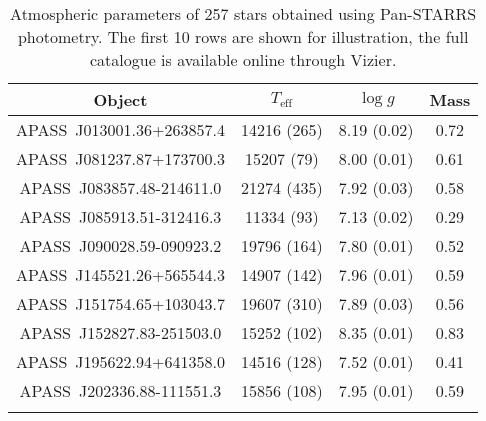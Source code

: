 \documentclass[fleqn,usenatbib, useAMS]{mnras}
\newcommand{\Teff}{\mbox{$T_{\mathrm{eff}}$}}
\newcommand{\logg}{\mbox{$\log g$}}
\begin{document}
\begin{table*}
\centering
\caption{Atmospheric parameters of 257 stars obtained using Pan-STARRS photometry. The first 10 rows are shown for illustration, the full catalogue is available online through Vizier.}
\begin{tabular}{cccc} \hline
Object & \Teff & \logg & Mass \\ \hline
APASS\ J013001.36+263857.4	&	14216	(265)	&	8.19	(0.02)	&	0.72	\\
APASS\ J081237.87+173700.3	&	15207	(79)	&	8.00	(0.01)	&	0.61	\\
APASS\ J083857.48-214611.0	&	21274	(435)	&	7.92	(0.03)	&	0.58	\\
APASS\ J085913.51-312416.3	&	11334	(93)	&	7.13	(0.02)	&	0.29	\\
APASS\ J090028.59-090923.2	&	19796	(164)	&	7.80	(0.01)	&	0.52	\\
APASS\ J145521.26+565544.3	&	14907	(142)	&	7.96	(0.01)	&	0.59	\\
APASS\ J151754.65+103043.7	&	19607	(310)	&	7.89	(0.03)	&	0.56	\\
APASS\ J152827.83-251503.0	&	15252	(102)	&	8.35	(0.01)	&	0.83	\\
APASS\ J195622.94+641358.0	&	14516	(128)	&	7.52	(0.01)	&	0.41	\\
APASS\ J202336.88-111551.3	&	15856	(108)	&	7.95	(0.01)	&	0.59	\\
\hline
\label{tab:panst_params}
\end{tabular}
\end{table*}
\end{document}
